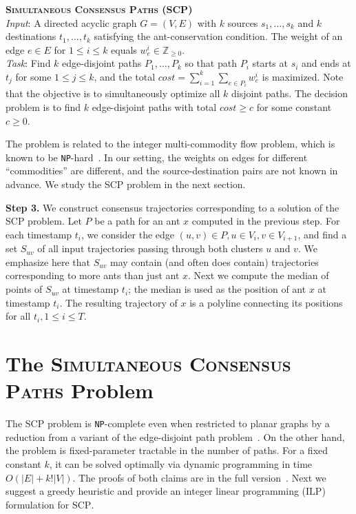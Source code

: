 \documentclass[runningheads]{llncs}
\newcommand{\blink}[1]{\textnormal{\texttt{#1}}}
\newcommand{\NPC}[0]{\blink{NP}-complete}
\newcommand{\NPH}[0]{\blink{NP}-hard}
\newcommand{\SCoP}{\textsc{SCP}}
\begin{document}
\noindent\textbf{\textsc{Simultaneous Consensus Paths} (SCP)}\\
\indent\emph{Input}: A directed acyclic graph $G=(V,E)$ with $k$
sources $s_1,\dots,s_k$ and $k$ destinations $t_1,\dots,t_k$
satisfying the ant-conservation condition.
The weight of an edge $e\in E$ for $1\le i \le k$ equals $w_e^i \in
\mathbb{Z}_{\ge 0}$.\\
\indent\emph{Task}: Find $k$ edge-disjoint paths $P_1,\dots,P_k$ so
that path $P_i$ starts at $s_i$ and ends at $t_j$ for some $1\le j \le k$,
and the total
$cost=\sum_{i=1}^k \sum_{e\in P_i} w_e^i$ is maximized. Note that the
objective is to simultaneously optimize all $k$ disjoint paths.
The decision problem is to find $k$ edge-disjoint paths with total $cost \ge c$ for some constant $c \ge 0$.

The problem is related to the integer multi-commodity flow problem,
which is known to be \NPH{}~\cite{Even75}. In our setting, the weights
on edges for different ``commodities'' are different, and the
source-destination pairs are not known in advance.
We study the \SCoP{} problem in the next section.

{\bf Step 3.}
We construct consensus trajectories corresponding to a solution of
the \SCoP{} problem. Let $P$ be a path for an ant $x$ computed
in the previous step. For each timestamp $t_i$, we consider the edge
$(u,v)\in P, u\in V_i, v\in V_{i+1}$, and find a set $S_{uv}$ of all
input trajectories passing through both clusters $u$ and $v$. We
emphasize here that $S_{uv}$ may contain (and often does contain)
trajectories corresponding to more ants than just ant $x$. Next we
compute the median of points of $S_{uv}$ at timestamp $t_i$; the
median is used as the position of ant $x$ at timestamp $t_i$. The
resulting trajectory of $x$ is a polyline connecting its positions for
all $t_i, 1\le i \le T$.

\section{The \textsc{Simultaneous Consensus Paths} Problem}
\label{sect:antprob}

The \SCoP{} problem is \NPC{} even when restricted to planar graphs by a reduction from a
variant of the edge-disjoint path problem~\cite{Marx04}.
On the other hand, the problem is fixed-parameter tractable in the number of paths.
For a fixed constant $k$, it can be solved optimally via dynamic programming
in time $O(|E| + k!|V|)$. The proofs of both claims are in the full version~\cite{arxiv12}.
Next we suggest a greedy heuristic and provide an integer linear programming (ILP) formulation for \SCoP{}.
\end{document}
